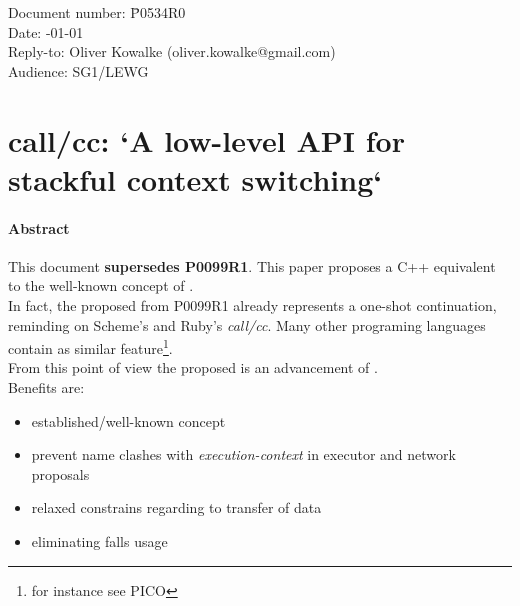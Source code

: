 \documentclass[paper=A4,pagesize,DIV=15]{scrartcl}
\begin{document}
\small
\begin{tabbing}
    Document number: \= P0534R0\\
    Date:            -01-01\\
    Reply-to:        \> Oliver Kowalke (oliver.kowalke@gmail.com)\\
    Audience:        \> SG1/LEWG\\
\end{tabbing}

\section*{call/cc: `A low-level API for stackful context switching`}


\tableofcontents


\paragraph*{Abstract}
This document {\bfseries supersedes P0099R1}.
\newline
This paper proposes a C++ equivalent to the well-known concept of \callcc.\\
In fact, the proposed \etc from P0099R1\cite{P0099R1} already represents a
one-shot continuation, reminding on Scheme's\cite{schemecallcc} and
Ruby's\cite{rubycallcc} \emph{call/cc}. Many other programing languages contain
as similar feature\footnote{for instance see PICO\cite{picocallcc}}.\\
\newline
From this point of view the proposed \cc is an advancement of \ectx.\\
\newline
Benefits are:
\begin{itemize}
    \item   established/well-known concept
    \item   prevent name clashes with \emph{execution-context} in
            executor and network proposals
    \item   relaxed constrains regarding to transfer of data
    \item   eliminating falls usage
\end{itemize}












\end{document}
